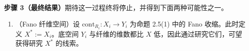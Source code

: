 \par\medskip\noindent\textbf{步骤 3（最终结果）}\quad 期待这一过程终将停止，并得到下面两种可能性之一。
\begin{enumerate}[label=（\arabic*）,leftmargin=2.6em,itemsep=1pt]
\item （Fano 纤维空间）设 $\mathrm{cont}_{R_i}\colon X_i\to Y_i$ 为命题 2.5(1) 中的 Fano 收缩。此时定义 $X^*:=X_i$。底空间 $Y_i$ 与纤维的维数都比 $X$ 低，因此通过研究它们，可望获得研究 $X^*$ 的线索。
\end{enumerate}
